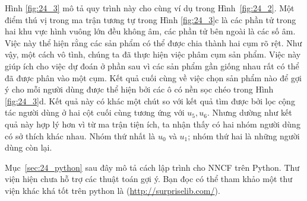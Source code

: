 Hình \ref{fig:24_3} mô tả quy trình này cho cùng ví dụ trong Hình~\ref{fig:24_2}. Một điểm
thú vị trong ma trận tương tự trong Hình \ref{fig:24_3}c là các phần tử trong
hai khu vực hình vuông lớn đều không âm, các phần tử bên ngoài
là các số âm. Việc này thể hiện rằng các sản phẩm có thể được chia thành
hai cụm rõ rệt. Như vậy, một cách {vô tình}, chúng ta đã thực
hiện việc phâm cụm sản phẩm. Việc này giúp ích cho việc dự
đoán ở phần sau vì các sản phẩm gần giống nhau rất có thể đã được phân vào
một cụm.
Kết quả cuối cùng về việc chọn sản phẩm nào để gợi ý cho mỗi
người dùng được thể hiện bởi các ô có nền sọc chéo trong Hình \ref{fig:24_3}d. Kết quả
này có khác một chút so với kết quả tìm được bởi lọc cộng tác người dùng ở hai cột cuối
cùng tương ứng với $u_5, u_6$. Nhưng dường như kết quả này {hợp lý} hơn vì từ ma trận tiện ích, ta nhận thấy có hai nhóm người dùng có sở thích khác nhau. Nhóm thứ nhất là $u_0$ và $u_1$; nhóm thứ hai là những người dùng còn lại.

Mục~\ref{sec:24_python} sau đây mô tả cách lập trình cho NNCF trên
Python. Thư viện  hiện chưa hỗ trợ các thuật toán gợi ý. Bạn đọc có thể tham khảo một thư viện khác khá tốt trên python là  (\url{http://surpriselib.com/}).

